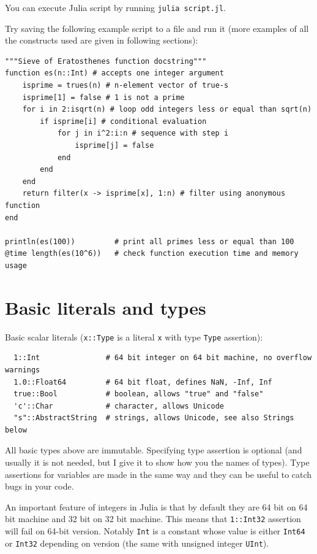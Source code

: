 \documentclass[10pt,a4paper]{article}
\begin{document}
You can execute Julia script by running \lstinline|julia script.jl|.

Try saving the following example script to a file and run it (more examples of all the constructs used are given in following sections):
\begin{lstlisting}
"""Sieve of Eratosthenes function docstring"""
function es(n::Int) # accepts one integer argument
    isprime = trues(n) # n-element vector of true-s
    isprime[1] = false # 1 is not a prime
    for i in 2:isqrt(n) # loop odd integers less or equal than sqrt(n)
        if isprime[i] # conditional evaluation
            for j in i^2:i:n # sequence with step i
                isprime[j] = false
            end
        end
    end
    return filter(x -> isprime[x], 1:n) # filter using anonymous function
end

println(es(100))         # print all primes less or equal than 100
@time length(es(10^6))   # check function execution time and memory usage
\end{lstlisting}

\section{Basic literals and types}
Basic scalar literals (\lstinline|x::Type| is a literal \lstinline|x| with type \lstinline|Type| assertion):
\begin{lstlisting}
  1::Int               # 64 bit integer on 64 bit machine, no overflow warnings
  1.0::Float64         # 64 bit float, defines NaN, -Inf, Inf
  true::Bool           # boolean, allows "true" and "false"
  'c'::Char            # character, allows Unicode
  "s"::AbstractString  # strings, allows Unicode, see also Strings below
\end{lstlisting}
All basic types above are immutable.
Specifying type assertion is optional (and usually it is not needed, but I give it to show how you the names of types).
Type assertions for variables are made in the same way and they can be useful to catch bugs in your code.

An important feature of integers in Julia is that by default they are 64 bit on 64 bit machine and 32 bit on 32 bit machine. This means that \lstinline|1::Int32| assertion will fail on 64-bit version. Notably \lstinline|Int| is a constant whose value is either \lstinline|Int64| or \lstinline|Int32| depending on version (the same with unsigned integer \lstinline|UInt|). 
\end{document}
